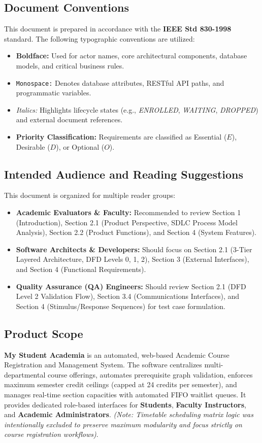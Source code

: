 \documentclass[a4paper,12pt]{article}
\begin{document}
\subsection{Document Conventions}
This document is prepared in accordance with the \textbf{IEEE Std 830-1998} standard. The following typographic conventions are utilized:
\begin{itemize}[leftmargin=1.2cm]
    \item \textbf{Boldface:} Used for actor names, core architectural components, database models, and critical business rules.
    \item \texttt{Monospace:} Denotes database attributes, RESTful API paths, and programmatic variables.
    \item \textit{Italics:} Highlights lifecycle states (e.g., \textit{ENROLLED}, \textit{WAITING}, \textit{DROPPED}) and external document references.
    \item \textbf{Priority Classification:} Requirements are classified as Essential ($E$), Desirable ($D$), or Optional ($O$).
\end{itemize}

\subsection{Intended Audience and Reading Suggestions}
This document is organized for multiple reader groups:
\begin{itemize}[leftmargin=1.2cm]
    \item \textbf{Academic Evaluators \& Faculty:} Recommended to review Section 1 (Introduction), Section 2.1 (Product Perspective, SDLC Process Model Analysis), Section 2.2 (Product Functions), and Section 4 (System Features).
    \item \textbf{Software Architects \& Developers:} Should focus on Section 2.1 (3-Tier Layered Architecture, DFD Levels 0, 1, 2), Section 3 (External Interfaces), and Section 4 (Functional Requirements).
    \item \textbf{Quality Assurance (QA) Engineers:} Should review Section 2.1 (DFD Level 2 Validation Flow), Section 3.4 (Communications Interfaces), and Section 4 (Stimulus/Response Sequences) for test case formulation.
\end{itemize}

\subsection{Product Scope}
\textbf{My Student Academia} is an automated, web-based Academic Course Registration and Management System. The software centralizes multi-departmental course offerings, automates prerequisite graph validation, enforces maximum semester credit ceilings (capped at 24 credits per semester), and manages real-time section capacities with automated FIFO waitlist queues. It provides dedicated role-based interfaces for \textbf{Students}, \textbf{Faculty Instructors}, and \textbf{Academic Administrators}. \textit{(Note: Timetable scheduling matrix logic was intentionally excluded to preserve maximum modularity and focus strictly on course registration workflows)}.
\end{document}
